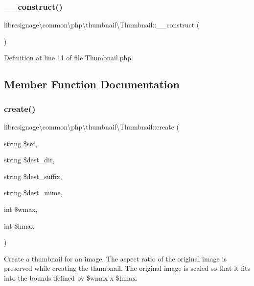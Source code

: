 \subsubsection{\texorpdfstring{\+\_\+\+\_\+construct()}{\_\_construct()}}
{\footnotesize\ttfamily libresignage\textbackslash{}common\textbackslash{}php\textbackslash{}thumbnail\textbackslash{}\+Thumbnail\+::\+\_\+\+\_\+construct (\begin{DoxyParamCaption}{ }\end{DoxyParamCaption})}



Definition at line 11 of file Thumbnail.\+php.



\subsection{Member Function Documentation}
\mbox{\label{classlibresignage_1_1common_1_1php_1_1thumbnail_1_1Thumbnail_af6131c8ce760226849679fe4d7bcb2a5}} 
\subsubsection{\texorpdfstring{create()}{create()}}
{\footnotesize\ttfamily libresignage\textbackslash{}common\textbackslash{}php\textbackslash{}thumbnail\textbackslash{}\+Thumbnail\+::create (\begin{DoxyParamCaption}\item[{string}]{\$src,  }\item[{string}]{\$dest\+\_\+dir,  }\item[{string}]{\$dest\+\_\+suffix,  }\item[{string}]{\$dest\+\_\+mime,  }\item[{int}]{\$wmax,  }\item[{int}]{\$hmax }\end{DoxyParamCaption})}

Create a thumbnail for an image. The aspect ratio of the original image is preserved while creating the thumbnail. The original image is scaled so that it fits into the bounds defined by \$wmax x \$hmax.


